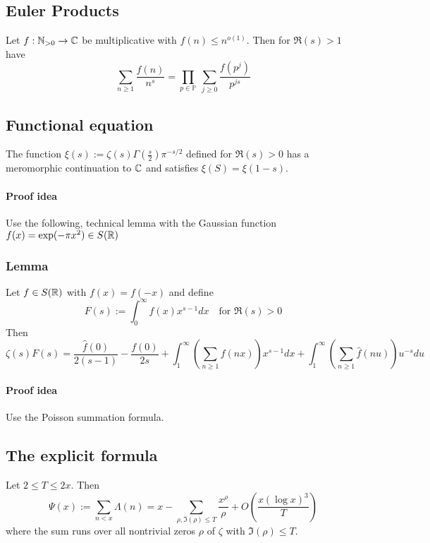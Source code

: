 \subsection{Euler Products}
Let $f: \mathbb{N}_{>0} \to \mathbb{C}$ be multiplicative with $f(n) \leq n^{o(1)}$. Then for $\Re(s) > 1$ have
\begin{equation*}
    \sum_{n \geq 1} \frac {f(n)} {n^s} = \prod_{p \in \mathbb{P}} \ \sum_{j \geq 0} \frac {f(p^j)} {p^{js}}
\end{equation*}

\subsection{Functional equation}
The function $\xi(s) := \zeta(s)\Gamma(\frac s 2) \pi^{-s/2}$ defined for $\Re(s) > 0$ has a meromorphic continuation to $\mathbb{C}$ and satisfies $\xi(S) = \xi(1 - s)$.
\paragraph{Proof idea} Use the following, technical lemma with the Gaussian function $f(x) = \exp(-\pi x^2) \in S(\mathbb{R})$ 
\subsubsection*{Lemma}
Let $f \in S(\mathbb{R})$ with $f(x) = f(-x)$ and define
\begin{equation*}
    F(s) := \int_0^\infty f(x) x^{s - 1} dx \quad \text{for $\Re(s) > 0$}
\end{equation*}
Then
\begin{equation*}
    \zeta(s)F(s) = \frac {\hat{f}(0)} {2(s - 1)} - \frac {f(0)} {2s} + \int_1^\infty \left( \sum_{n \geq 1} f(nx) \right) x^{s - 1} dx + \int_1^\infty \left( \sum_{n \geq 1} \hat{f}(nu) \right) u^{-s} du
\end{equation*}
\paragraph{Proof idea} Use the Poisson summation formula.

\subsection{The explicit formula}
Let $2 \leq T \leq 2x$. Then
\begin{equation*}
    \Psi(x) := \sum_{n < x} \Lambda(n) = x - \sum_{\rho, \Im(\rho) \leq T} \frac {x^\rho} \rho + O\left( \frac {x (\log x)^3} T \right)
\end{equation*}
where the sum runs over all nontrivial zeros $\rho$ of $\zeta$ with $\Im(\rho) \leq T$.
